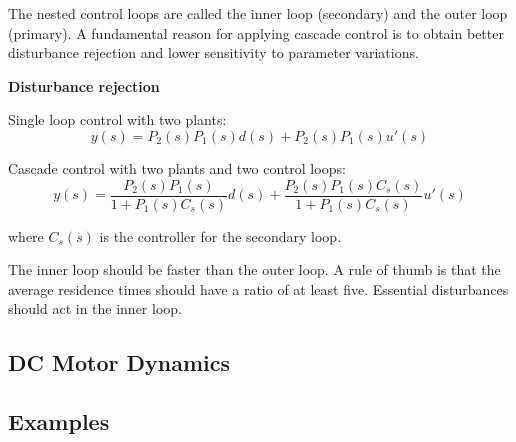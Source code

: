 The nested control loops are called the inner loop (secondary) and the outer loop (primary).
A fundamental reason for applying cascade control is to obtain better disturbance rejection
and lower sensitivity to parameter variations.

\textbf{Disturbance rejection}

Single loop control with two plants:
$$ y(s) = P_2(s)P_1(s)d(s) + P_2(s)P_1(s)u'(s)$$

Cascade control with two plants and two control loops:
$$ y(s) = \frac{P_2(s)P_1(s)}{1+P_1(s)C_s(s)}d(s) + \frac{P_2(s)P_1(s)C_s(s)}{1+P_1(s)C_s(s)}u'(s)$$

where $C_s(s)$ is the controller for the secondary loop.

The inner loop should be faster than the outer loop. A rule of thumb is that the average residence times should have a ratio
of at least five. Essential disturbances should act in the inner loop.

\subsection{DC Motor Dynamics}

\subsection{Examples}
